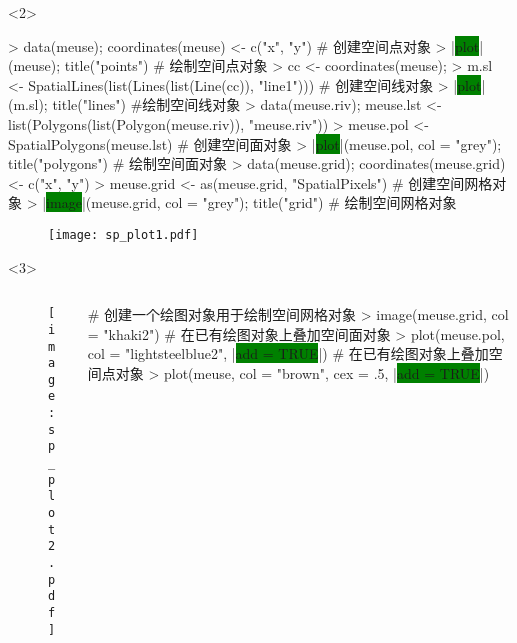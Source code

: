 \begin{frame}[t,fragile]{\subsecname}{\subsubsecname}
\begin{overlayarea}{\textwidth}{\textheight}
\begin{onlyenv}<2>
\begin{rcode}
> data(meuse); coordinates(meuse) <- c("x", "y") # 创建空间点对象
> |\colorbox{green}{plot}|(meuse); title("points") # 绘制空间点对象
> cc <- coordinates(meuse);
> m.sl <- SpatialLines(list(Lines(list(Line(cc)), "line1"))) # 创建空间线对象
> |\colorbox{green}{plot}|(m.sl); title("lines") #绘制空间线对象
> data(meuse.riv); meuse.lst <- list(Polygons(list(Polygon(meuse.riv)), "meuse.riv"))
> meuse.pol <- SpatialPolygons(meuse.lst) # 创建空间面对象
> |\colorbox{green}{plot}|(meuse.pol, col = "grey"); title("polygons") # 绘制空间面对象
> data(meuse.grid); coordinates(meuse.grid) <- c("x", "y")
> meuse.grid <- as(meuse.grid, "SpatialPixels") # 创建空间网格对象
> |\colorbox{green}{image}|(meuse.grid, col = "grey"); title("grid") # 绘制空间网格对象
\end{rcode}
\begin{figure}[ht] \vspace{-10pt}
  \centering 
  \texttt{[image: sp\_plot1.pdf]}
\end{figure}
\end{onlyenv}

\begin{onlyenv}<3>
\begin{columns} 
\begin{column}{.4\textwidth}
\begin{figure}[ht] \vspace{-10pt}
  \centering 
  \texttt{[image: sp\_plot2.pdf]}
\end{figure}
\end{column}

\begin{column}{.6\textwidth}
\centering
\begin{rcode}
# 创建一个绘图对象用于绘制空间网格对象
> image(meuse.grid, col = "khaki2")
# 在已有绘图对象上叠加空间面对象
> plot(meuse.pol, col = "lightsteelblue2", |\colorbox{green}{add = TRUE}|)
# 在已有绘图对象上叠加空间点对象
> plot(meuse, col = "brown", cex = .5, |\colorbox{green}{add = TRUE}|)
\end{rcode}
\end{column}
\end{columns}
\end{onlyenv}
\end{overlayarea}
\end{frame}

